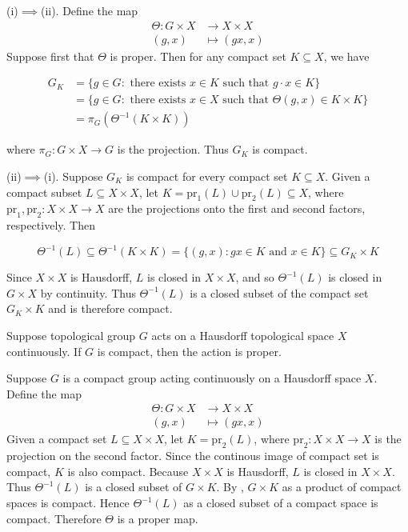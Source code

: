 \documentclass{report}
\begin{document}
\begin{prf}
(i)$\implies$(ii). Define the map
\begin{align*}
	\Theta: G \times X &\longrightarrow X \times X\\
	(g, x) &\longmapsto(g x, x)
\end{align*}
Suppose first that $\Theta$ is proper. Then for any compact set $K \subseteq X$, we have

$$
\begin{aligned}
G_K & =\{g \in G: \text { there exists } x\in K \text { such that } g \cdot x \in K\} \\
& =\{g \in G: \text { there exists } x \in X \text { such that } \Theta(g, x) \in K \times K\} \\
& =\pi_G\left(\Theta^{-1}(K \times K)\right)
\end{aligned}
$$

where $\pi_G: G \times X \rightarrow G$ is the projection. Thus $G_K$ is compact.

(ii)$\implies$(i). Suppose $G_K$ is compact for every compact set $K \subseteq X$. Given a compact subset $L \subseteq X \times X$, let $K=\mathrm{pr}_1(L) \cup \mathrm{pr}_2(L) \subseteq X$, where $\mathrm{pr}_1, \mathrm{pr}_2: X \times X \rightarrow X$ are the projections onto the first and second factors, respectively. Then

$$
\Theta^{-1}(L) \subseteq \Theta^{-1}(K \times K)=\{(g, x): g x \in K \text { and } x \in K\} \subseteq G_K \times K
$$


Since $X\times X$ is Hausdorff, $L$ is closed in $X \times X$, and so $\Theta^{-1}(L)$ is closed in $G \times X$ by continuity. Thus $\Theta^{-1}(L)$ is a closed subset of the compact set $G_K \times K$ and is therefore compact.
\end{prf}


\begin{proposition}{}{}
	Suppose topological group $G$ acts on a Hausdorff topological space $X$ continuously. If $G$ is compact, then the action is proper.
\end{proposition}
\begin{prf}
	Suppose $G$ is a compact group acting continuously on a Hausdorff space $X$. Define the map
	\begin{align*}
		\Theta: G \times X &\longrightarrow X \times X\\
		(g, x) &\longmapsto(g x, x)
	\end{align*}
	Given a compact set $L \subseteq X \times X$, let $K=\mathrm{pr}_2(L)$, where $\mathrm{pr}_2: X \times X \rightarrow X$ is the projection on the second factor. Since the continous image of compact set is compact, $K$ is also compact. Because $X \times X$ is Hausdorff, $L$ is closed in $X \times X$. Thus $\Theta^{-1}(L)$ is a closed subset of $G \times K$. By , $G \times K$ as a product of compact spaces is compact. Hence $\Theta^{-1}(L)$ as a closed subset of a compact space is compact. Therefore $\Theta$ is a proper map.
\end{prf}
\end{document}

